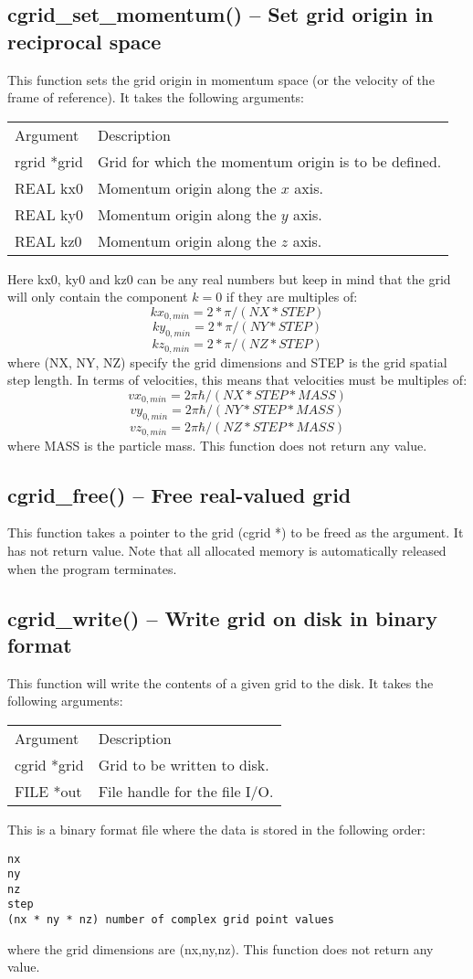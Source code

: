 \documentclass[12pt,letterpaper]{report}
\begin{document}
\subsection{cgrid\_set\_momentum() -- Set grid origin in reciprocal space}

This function sets the grid origin in momentum space (or the velocity of the frame of reference). It takes the following arguments:
\begin{longtable}{p{} p{}}
Argument & Description\\
\cline{1-2}
rgrid *grid & Grid for which the momentum origin is to be defined.\\
REAL kx0 & Momentum origin along the $x$ axis.\\
REAL ky0 & Momentum origin along the $y$ axis.\\
REAL kz0 & Momentum origin along the $z$ axis.\\
\end{longtable}
\noindent
Here kx0, ky0 and kz0 can be any real numbers but keep in mind that the grid will only contain the component $k = 0$ if they are multiples of:
$$kx_{0,min} = 2 * \pi / (NX * STEP)$$
$$ky_{0,min} = 2 * \pi / (NY * STEP)$$
$$kz_{0,min} = 2 * \pi / (NZ * STEP)$$
\noindent
where (NX, NY, NZ) specify the grid dimensions and STEP is the grid spatial step length. In terms of velocities, this means that velocities must be multiples of:
$$vx_{0,min} = 2\pi\hbar / (NX * STEP * MASS)$$
$$vy_{0,min} = 2\pi\hbar / (NY * STEP * MASS)$$
$$vz_{0,min} = 2\pi\hbar / (NZ * STEP * MASS)$$
where MASS is the particle mass. This function does not return any value.

\subsection{cgrid\_free() -- Free real-valued grid}

This function takes a pointer to the grid (cgrid *) to be freed as the argument. It has not return value. Note that all allocated memory is automatically released when the program terminates.

\subsection{cgrid\_write() -- Write grid on disk in binary format}

This function will write the contents of a given grid to the disk. It takes the following arguments:
\begin{longtable}{p{} p{}}
Argument & Description\\
\cline{1-2}
cgrid *grid & Grid to be written to disk.\\
FILE *out & File handle for the file I/O.\\
\end{longtable}
\noindent
This is a binary format file where the data is stored in the following order:
\begin{verbatim}
nx
ny
nz
step
(nx * ny * nz) number of complex grid point values
\end{verbatim}
where the grid dimensions are (nx,ny,nz). This function does not return any value.
\end{document}
